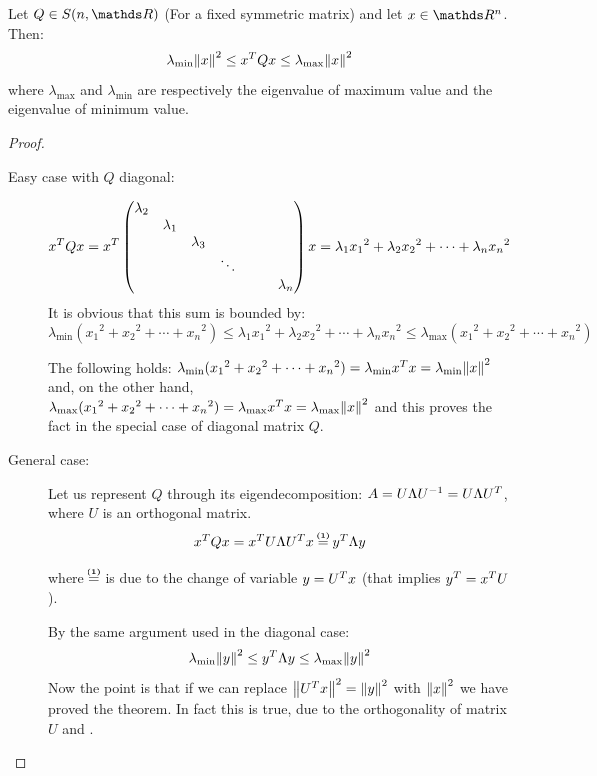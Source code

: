 \documentclass[ComputationalMathematics.tex]{subfiles}
\begin{document}
\begin{proposition}
  Let $Q \in S(n, \R)$ (For a fixed symmetric matrix) and let $x \in \R^n$. Then:
  \[
    \lambda_{\text{min}} {\left\lVert x\right\rVert}^2 \le {x}^{T}Qx \le \lambda_{\text{max}} {\left\lVert x\right\rVert}^2
  \]
  where $\lambda_{\text{max}}$ and $\lambda_{\text{min}}$ are respectively the eigenvalue of maximum value and the eigenvalue of minimum value.
\end{proposition}

\begin{proof}~\\
  \begin{description}
    \item[{\sc Easy case with $Q$ diagonal:}]
    
      \[{x}^{T}Qx = {x}^{T} \begin{pmatrix}
    \lambda_2\\
    &\lambda_1\\
    &&\lambda_3\\
    &&& \ddots\\
    &&&&&&\lambda_n\\
    \end{pmatrix}
      x = \lambda_1 {x_1}^2 + \lambda_2 {x_2}^2 + \cdots + \lambda_n {x_n}^2
      \]
  It is obvious that this sum is bounded by:
  \[
    \lambda_{\text{min}} ({x_1}^2 +{x_2}^2 + \cdots + {x_n}^2) \le  \lambda_1 {x_1}^2 + \lambda_2 {x_2}^2 + \cdots + \lambda_n {x_n}^2 \le \lambda_{\text{max}} ({x_1}^2 +{x_2}^2 + \cdots + {x_n}^2)
  \]

   The following holds: $ \lambda_{\text{min}} ({x_1}^2 +{x_2}^2 + \cdots + {x_n}^2) =  \lambda_{\text{min}} {x}^{T} x =  \lambda_{\text{min}} {\left\lVert x\right\rVert}^2$ and, on the other hand, $ \lambda_{\text{max}} ({x_1}^2 +{x_2}^2 + \cdots + {x_n}^2) =  \lambda_{\text{max}} {x}^{T} x =  \lambda_{\text{max}} {\left\lVert x\right\rVert}^2$ and this proves the fact in the special case of diagonal matrix $Q$.
    \item[{\sc General case:}]
      Let us represent $Q$ through its eigendecomposition: $A = U \Lambda {U}^{-1} = U \Lambda {U}^{T}$, where $U$ is an orthogonal matrix.
      \[
        \tr{x}Qx = \tr{x} U \Lambda \tr{U} x \numeq{(1)} \tr{y} \Lambda y
      \]

      where $\numeq{(1)}$ is due to the change of variable $y = {U}^{T} x$ (that implies ${y}^{T} = {x}^{T} U$).

      By the same argument used in the diagonal case:
      \[
        \lambda_{\text{min}} {\left\lVert y\right\rVert}^2 \le {y}^{T} \Lambda y \le \lambda_{\text{max}} {\left\lVert y\right\rVert}^2
      \]
      Now the point is that if we can replace ${\left\lVert{U}^{T}x\right\rVert}^2 = {\left\lVert y\right\rVert}^2$ with ${\left\lVert x\right\rVert}^2$ we have proved the theorem.
      In fact this is true, due to the orthogonality of matrix $U$ and .
  \end{description}
\end{proof}
\end{document}
